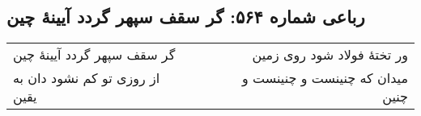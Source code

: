 \begin{center}
\section*{رباعی شماره ۵۶۴: گر سقف سپهر گردد آیینهٔ چین}
\label{sec:sh564}
\begin{longtable}{l p{0.5cm} r}
گر سقف سپهر گردد آیینهٔ چین
&&
ور تختهٔ فولاد شود روی زمین
\\
از روزی تو کم نشود دان به یقین
&&
میدان که چنینست و چنینست و چنین
\\
\end{longtable}
\end{center}
